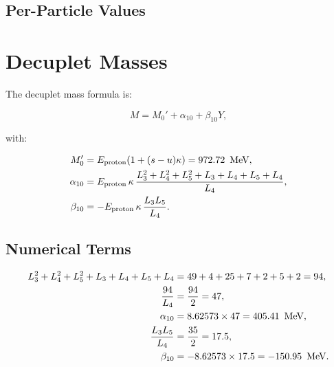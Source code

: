 \subsection{Per-Particle Values}

\begin{center}
\end{center}

\section{Decuplet Masses}

The decuplet mass formula is:

\[
M = M_0' + \alpha_{10} + \beta_{10} Y,
\]

with:

\[
\begin{aligned}
M_0'    &= E_{\text{proton}}(1 + (s-u)\kappa) = 972.72\ \,\text{MeV}, \\
\alpha_{10} &= E_{\text{proton}}\,\kappa\,\frac{L_3^2 + L_4^2 + L_5^2 + L_3 + L_4 + L_5 + L_4}{L_4}, \\
\beta_{10} &= -E_{\text{proton}}\,\kappa\,\frac{L_3 L_5}{L_4}.
\end{aligned}
\]

\subsection{Numerical Terms}

\[
\begin{aligned}
L_3^2 + L_4^2 + L_5^2 + L_3 + L_4 + L_5 + L_4 &= 49 + 4 + 25 + 7 + 2 + 5 + 2 = 94, \\
\frac{94}{L_4} &= \frac{94}{2} = 47, \\
\alpha_{10} &= 8.62573 \times 47 = 405.41\ \,\text{MeV}, \\
\frac{L_3 L_5}{L_4} &= \frac{35}{2} = 17.5, \\
\beta_{10} &= -8.62573 \times 17.5 = -150.95\ \,\text{MeV}.
\end{aligned}
\]

